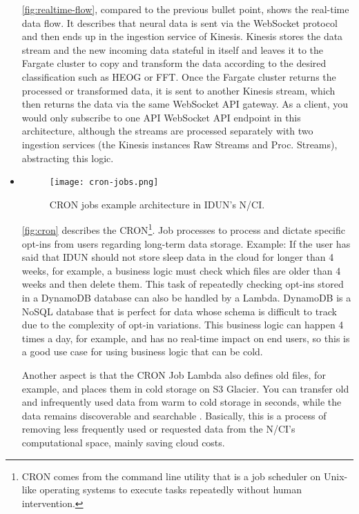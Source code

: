 \begin{itemize}
        \autoref{fig:realtime-flow}, compared to the previous bullet point, shows the real-time data flow. It describes that neural data is sent via the WebSocket protocol and then ends up in the ingestion service of Kinesis. Kinesis stores the data stream and the new incoming data stateful in itself and leaves it to the Fargate cluster to copy and transform the data according to the desired classification such as HEOG or FFT. Once the Fargate cluster returns the processed or transformed data, it is sent to another Kinesis stream, which then returns the data via the same WebSocket API gateway. As a client, you would only subscribe to one API WebSocket API endpoint in this architecture, although the streams are processed separately with two ingestion services (the Kinesis instances Raw Streams and Proc. Streams), abstracting this logic.

  \item \begin{figure}[!ht]
          \centering
          \hspace*{0.4in}
          \texttt{[image: cron-jobs.png]}
          \caption{CRON jobs example architecture in IDUN's N/CI.}
          \label{fig:cron}
        \end{figure}

        \autoref{fig:cron} describes the CRON\footnote{CRON comes from the command line utility that is a job scheduler on Unix-like operating systems to execute tasks repeatedly without human intervention.}. Job processes to process and dictate specific opt-ins from users regarding long-term data storage. Example: If the user has said that IDUN should not store sleep data in the cloud for longer than 4 weeks, for example, a business logic must check which files are older than 4 weeks and then delete them. This task of repeatedly checking opt-ins stored in a DynamoDB database can also be handled by a Lambda. DynamoDB is a NoSQL database that is perfect for data whose schema is difficult to track due to the complexity of opt-in variations. This business logic can happen 4 times a day, for example, and has no real-time impact on end users, so this is a good use case for using business logic that can be cold.

        Another aspect is that the CRON Job Lambda also defines old files, for example, and places them in cold storage on S3 Glacier. You can transfer old and infrequently used data from warm to cold storage in seconds, while the data remains discoverable and searchable \citep{sayed_introducing_2021}. Basically, this is a process of removing less frequently used or requested data from the N/CI's computational space, mainly saving cloud costs.


\end{itemize}
